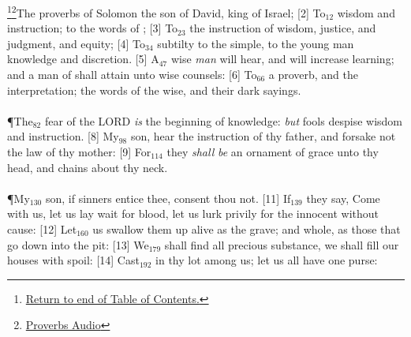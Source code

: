 \footnote{\textcolor[cmyk]{0.99998,1,0,0}{\hyperlink{TOC}{Return to end of Table of Contents.}}}\footnote{\href{https://www.audioverse.org/english/audiobibles/books/ENGKJV/O/Prov/1}{\textcolor[cmyk]{0.99998,1,0,0}{Proverbs Audio}}}\textcolor[cmyk]{0.99998,1,0,0}{The proverbs of Solomon the son of David, king of Israel;}
[2] \textcolor[cmyk]{0.99998,1,0,0}{To\textcolor{jungle}{$_{12}$}   wisdom and instruction; to   the words of ;}
[3] \textcolor[cmyk]{0.99998,1,0,0}{To\textcolor{jungle}{$_{23}$}   the instruction of wisdom, justice, and judgment, and equity;}
[4] \textcolor[cmyk]{0.99998,1,0,0}{To\textcolor{jungle}{$_{34}$}   subtilty to the simple, to the young man knowledge and discretion.}
[5] \textcolor[cmyk]{0.99998,1,0,0}{A\textcolor{jungle}{$_{47}$} wise \emph{man} will hear, and will increase learning; and a man of  shall attain unto wise counsels:}
[6] \textcolor[cmyk]{0.99998,1,0,0}{To\textcolor{jungle}{$_{66}$}   a proverb, and the interpretation; the words of the wise, and their dark sayings.}\\
\\
\P \textcolor[cmyk]{0.99998,1,0,0}{The\textcolor{jungle}{$_{82}$} fear of the LORD \emph{is} the beginning of knowledge: \emph{but} fools despise wisdom and instruction.}
[8] \textcolor[cmyk]{0.99998,1,0,0}{My\textcolor{jungle}{$_{98}$} son, hear the instruction of thy father, and forsake not the law of thy mother:}
[9] \textcolor[cmyk]{0.99998,1,0,0}{For\textcolor{jungle}{$_{114}$} they \emph{shall} \emph{be} an ornament of grace unto thy head, and chains about thy neck.}\\
\\
\P \textcolor[cmyk]{0.99998,1,0,0}{My\textcolor{jungle}{$_{130}$} son, if sinners entice thee, consent thou not.}
[11] \textcolor[cmyk]{0.99998,1,0,0}{If\textcolor{jungle}{$_{139}$} they say, Come with us, let us lay wait for blood, let us lurk privily for the innocent without cause:}
[12] \textcolor[cmyk]{0.99998,1,0,0}{Let\textcolor{jungle}{$_{160}$} us swallow them up alive as the grave; and whole, as those that go down into the pit:}
[13] \textcolor[cmyk]{0.99998,1,0,0}{We\textcolor{jungle}{$_{179}$} shall find all precious substance, we shall fill our houses with spoil:}
[14] \textcolor[cmyk]{0.99998,1,0,0}{Cast\textcolor{jungle}{$_{192}$} in thy lot among us; let us all have one purse:}
